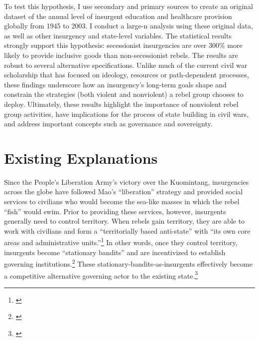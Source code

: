 \documentclass[12pt, letterpaper]{article}
\begin{document}
To test this hypothesis, I use secondary and primary sources to create an original dataset of the annual level of insurgent education and healthcare provision globally from 1945 to 2003. I conduct a large-n analysis using these original data, as well as other insurgency and state-level variables. The statistical results strongly support this hypothesis: secessionist insurgencies are over 300\% more likely to provide inclusive goods than non-secessionist rebels. The results are robust to several alternative specifications. Unlike much of the current civil war scholarship that has focused on ideology, resources or path-dependent processes, these findings underscore how an insurgency's long-term goals shape and constrain the strategies (both violent and nonviolent) a rebel group chooses to deploy. Ultimately, these results highlight the importance of nonviolent rebel group activities, have implications for the process of state building in civil wars, and address important concepts such as governance and sovereignty.

\section*{Existing Explanations}

Since the People's Liberation Army's victory over the Kuomintang, insurgencies across the globe have followed Mao's ``liberation'' strategy and provided social services to civilians who would become the sea-like masses in which the rebel ``fish'' would swim. Prior to providing these services, however, insurgents generally need to control territory. When rebels gain territory, they are able to work with civilians and form a ``territorially based anti-state'' with ``its own core areas and administrative units.''\footnote{\citealt[614]{mccoll1969insurgent}} In other words, once they control territory, insurgents become ``stationary bandits'' and are incentivized to establish governing institutions.\footnote{\citealt{olson1993dictatorship, ISQU:ISQU12196, stewart2015good}} These stationary-bandits-as-insurgents effectively become a competitive alternative governing actor to the existing state.\footnote{\citealt[191-2]{tilly1978mobilization}}
\end{document}
